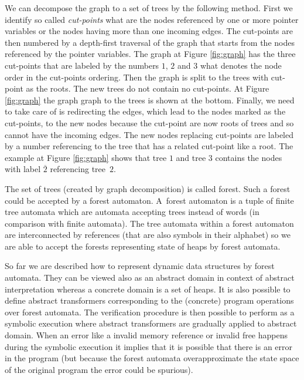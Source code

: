 \documentclass[fleqn,11pt]{ExcelAtFIT} %
\begin{document}
We can decompose the graph to a set of trees by the following method.
First we identify so called \emph{cut-points} what are the nodes referenced by
one or more pointer variables or the nodes having more than one incoming edges.
The cut-points are then numbered by a depth-first traversal of the graph that starts from
the nodes referenced by the pointer variables.
The graph at Figure \ref{fig:graph} has the three cut-points that are labeled by the numbers $1$,
$2$ and $3$ what denotes the node order in the cut-points ordering.
Then the graph is split to the trees with cut-point as the roots.
The new trees do not contain no cut-points.
At Figure \ref{fig:graph} the graph graph to the trees is shown at the bottom.
Finally, we need to take care of is redirecting the edges, which lead to the nodes
marked as the cut-points, to the new nodes because the cut-point are now roots of trees and
so cannot have the incoming edges.
The new nodes replacing cut-points are labeled by a number referencing to the tree that has a related cut-point like a root.
The example at Figure \ref{fig:graph} shows that tree $1$ and tree $3$ contains the nodes with label $\overline{2}$
referencing tree~$2$.

The set of trees (created by graph decomposition) is called forest.
Such a forest could be accepted by a forest automaton.
A~forest automaton is a tuple of finite tree automata which are automata accepting trees instead of words (in comparison with finite automata).
The tree automata within a forest automaton are interconnected by references (that are also symbols in their alphabet)
so we are able to accept the forests representing state of heaps by forest automata.

So far we are described how to represent dynamic data structures by forest automata.
They can be viewed also as an abstract domain in context of abstract interpretation
whereas a concrete domain is a set of heaps.
It is also possible to define abstract transformers corresponding to the (concrete) program operations over forest automata.
The verification procedure is then possible to perform as a symbolic execution
where abstract transformers are gradually applied to abstract domain.
When an error like a invalid memory reference or invalid free happens during the symbolic
execution it implies that it is possible that there is an error in the program (but because
the forest automata overapproximate the state space of the original program the error could be spurious).
\end{document}

